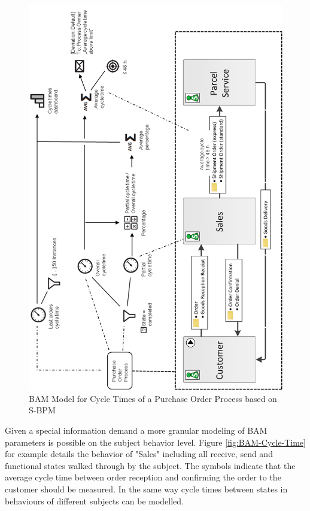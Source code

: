 \begin{figure}[htbp]
	\centering
	\includegraphics[width=0.9\linewidth]{Figures/Chapter5/Monitoring/BAM-Model-fo- Cycle-Times-of-a-Purchase-Order-Process-based-on-S-BPM_NEW.png}
	\caption[BAM Model for Cycle Times of a Purchase Order Process based on S-BPM]{BAM Model for Cycle Times of a Purchase Order Process based on S-BPM}
	\label{fig:Cycle-Time-SBPM}
\end{figure}

Given a special information demand a more granular modeling of BAM parameters is possible on the subject behavior level. Figure \ref{fig:BAM-Cycle-Time} for example details the behavior of "Sales" including all receive, send and functional states walked through by the subject. The symbols indicate that the average cycle time between order reception and confirming the order to the customer should be measured. In the same way cycle times between states in behaviours of different subjects can be modelled.


